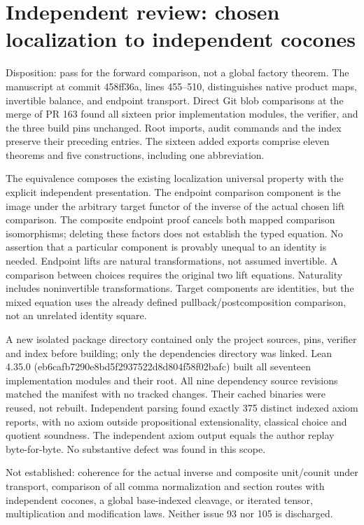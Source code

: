 \documentclass{article}
\begin{document}
\section*{Independent review: chosen localization to independent cocones}
Disposition: pass for the forward comparison, not a global factory theorem.
The manuscript at commit 458ff36a, lines 455--510, distinguishes native product maps, invertible balance, and endpoint transport. Direct Git blob comparisons at the merge of PR 163 found all sixteen prior implementation modules, the verifier, and the three build pins unchanged. Root imports, audit commands and the index preserve their preceding entries. The sixteen added exports comprise eleven theorems and five constructions, including one abbreviation.

The equivalence composes the existing localization universal property with the explicit independent presentation. The endpoint comparison component is the image under the arbitrary target functor of the inverse of the actual chosen lift comparison. The composite endpoint proof cancels both mapped comparison isomorphisms; deleting these factors does not establish the typed equation. No assertion that a particular component is provably unequal to an identity is needed. Endpoint lifts are natural transformations, not assumed invertible. A comparison between choices requires the original two lift equations. Naturality includes noninvertible transformations. Target components are identities, but the mixed equation uses the already defined pullback/postcomposition comparison, not an unrelated identity square.

A new isolated package directory contained only the project sources, pins, verifier and index before building; only the dependencies directory was linked. Lean 4.35.0 (eb6cafb7290e8bd5f2937522d8d804f58f02bafc) built all seventeen implementation modules and their root. All nine dependency source revisions matched the manifest with no tracked changes. Their cached binaries were reused, not rebuilt. Independent parsing found exactly 375 distinct indexed axiom reports, with no axiom outside propositional extensionality, classical choice and quotient soundness. The independent axiom output equals the author replay byte-for-byte. No substantive defect was found in this scope.

Not established: coherence for the actual inverse and composite unit/counit under transport, comparison of all comma normalization and section routes with independent cocones, a global base-indexed cleavage, or iterated tensor, multiplication and modification laws. Neither issue 93 nor 105 is discharged.
\end{document}
